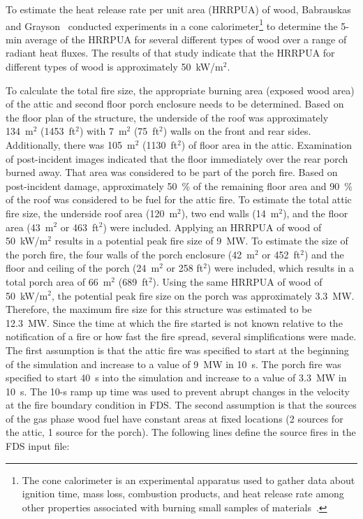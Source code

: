 \documentclass[12pt,oneside]{book}
\begin{document}
To estimate the heat release rate per unit area (HRRPUA) of wood, Babrauskas and Grayson~\cite{babrauskas1990} conducted experiments in a cone calorimeter\footnote{The cone calorimeter is an experimental apparatus used to gather data about ignition time, mass loss, combustion products, and heat release rate among other properties associated with burning small samples of materials~\cite{ASTM:E1355}.} to determine the 5-min average of the HRRPUA for several different types of wood over a range of radiant heat fluxes. The results of that study indicate that the HRRPUA for different types of wood is approximately 50~kW/m$^2$.

To calculate the total fire size, the appropriate burning area (exposed wood area) of the attic and second floor porch enclosure needs to be determined. Based on the floor plan of the structure, the underside of the roof was approximately 134~m$^2$ (1453~ft$^2$) with 7~m$^2$ (75~ft$^2$) walls on the front and rear sides. Additionally, there was 105~m$^2$ (1130~ft$^2$) of floor area in the attic. Examination of post-incident images indicated that the floor immediately over the rear porch burned away. That area was considered to be part of the porch fire. Based on post-incident damage, approximately 50~\% of the remaining floor area and 90~\% of the roof was considered to be fuel for the attic fire. To estimate the total attic fire size, the underside roof area (120~m$^2$), two end walls (14~m$^2$), and the floor area (43~m$^2$ or 463~ft$^2$) were included. Applying an HRRPUA of wood of 50~kW/m$^2$ results in a potential peak fire size of 9~MW. To estimate the size of the porch fire, the four walls of the porch enclosure (42~m$^2$ or 452~ft$^2$) and the floor and ceiling of the porch (24~m$^2$ or 258 ft$^2$) were included, which results in a total porch area of 66~m$^2$ (689~ft$^2$). Using the same HRRPUA of wood of 50~kW/m$^2$, the potential peak fire size on the porch was approximately 3.3~MW. Therefore, the maximum fire size for this structure was estimated to be 12.3~MW. Since the time at which the fire started is not known relative to the notification of a fire or how fast the fire spread, several simplifications were made. The first assumption is that the attic fire was specified to start at the beginning of the simulation and increase to a value of 9~MW in 10~s. The porch fire was specified to start 40~s into the simulation and increase to a value of 3.3~MW in 10~s. The 10-s ramp up time was used to prevent abrupt changes in the velocity at the fire boundary condition in FDS. The second assumption is that the sources of the gas phase wood fuel have constant areas at fixed locations (2 sources for the attic, 1 source for the porch). The following lines define the source fires in the FDS input file:
\end{document}
